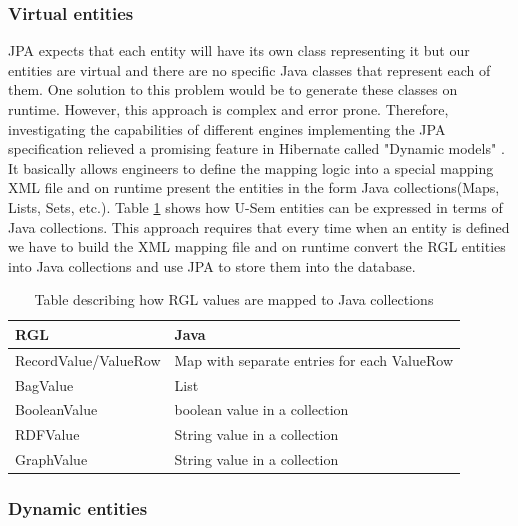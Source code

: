 \subsubsection{Virtual entities}

JPA expects that each entity will have its own class representing it but our entities are virtual and there are no specific Java classes that represent each of them. One solution to this problem would be to generate these classes on runtime. However, this approach is complex and error prone. Therefore, investigating the capabilities of different engines implementing the JPA specification relieved a promising feature in Hibernate called "Dynamic models" \cite{king2010hibernate}. It basically allows engineers to define the mapping logic into a special mapping XML file and on runtime present the entities in the form Java collections(Maps, Lists, Sets, etc.). Table \ref{tbl:rgl2java} shows how U-Sem entities can be expressed in terms of Java collections. This approach requires that every time when an entity is defined we have to build the XML mapping file and on runtime convert the RGL entities into Java collections and use JPA to store them into the database.

\begin{table}[h]
    \begin{tabular}{ | l | l |}
    \hline
    RGL & Java  \\ \hline
    RecordValue/ValueRow & Map with separate entries for each ValueRow \\ \hline
    BagValue & List  \\ \hline
    BooleanValue & boolean value in a collection  \\ \hline
    RDFValue & String value in a collection  \\ \hline
	GraphValue & String  value in a collection  \\ \hline

    \end{tabular}
     \caption{Table describing how RGL values are mapped to Java collections}
    \label{tbl:rgl2java}
\end{table}
 
\subsubsection{Dynamic entities}

